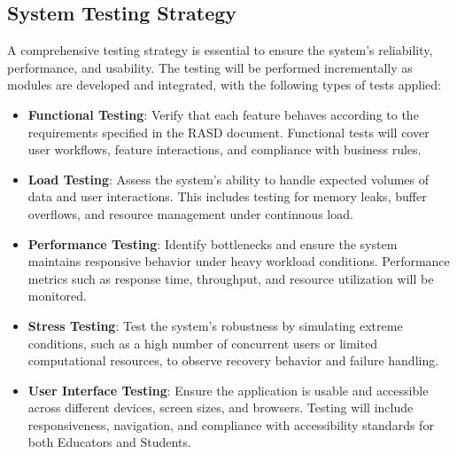 \subsection{System Testing Strategy}

A comprehensive testing strategy is essential to ensure the system’s reliability, performance, and usability. The testing will be performed incrementally as modules are developed and integrated, with the following types of tests applied:

\begin{itemize}
    \item \textbf{Functional Testing}:  
    Verify that each feature behaves according to the requirements specified in the RASD document. Functional tests will cover user workflows, feature interactions, and compliance with business rules.

    \item \textbf{Load Testing}:  
    Assess the system’s ability to handle expected volumes of data and user interactions. This includes testing for memory leaks, buffer overflows, and resource management under continuous load.

    \item \textbf{Performance Testing}:  
    Identify bottlenecks and ensure the system maintains responsive behavior under heavy workload conditions. Performance metrics such as response time, throughput, and resource utilization will be monitored.

    \item \textbf{Stress Testing}:  
    Test the system’s robustness by simulating extreme conditions, such as a high number of concurrent users or limited computational resources, to observe recovery behavior and failure handling.

    \item \textbf{User Interface Testing}:  
    Ensure the application is usable and accessible across different devices, screen sizes, and browsers. Testing will include responsiveness, navigation, and compliance with accessibility standards for both Educators and Students.

\end{itemize}